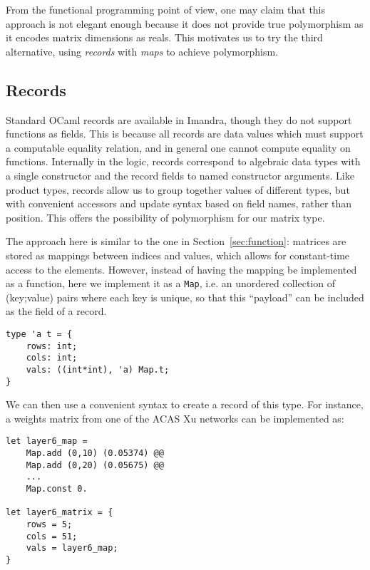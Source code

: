 \documentclass[runningheads]{llncs}
\newcommand{\knote}[1]{\todo[inline, color=blue!20]{#1}}
\begin{document}
From the functional programming point of view, one may claim that this approach is not elegant enough because
it does not provide true polymorphism as it encodes matrix dimensions as reals.
This motivates us to try the third alternative, using \emph{records} with \emph{maps} to achieve polymorphism.

\subsection{Records}

Standard OCaml records are available in Imandra, though they do not support functions as fields. This is because all records are data values which must support a computable equality relation, and in general one cannot compute equality on functions. Internally in the logic, records correspond to algebraic data types with a single constructor and the record fields to named constructor arguments. Like product types, records allow us to group together values of different types, but with convenient accessors and update syntax based on field names, rather than position. This offers the possibility of polymorphism for our matrix type. 

The approach here is similar to the one in Section~\ref{sec:function}: matrices are stored as mappings between indices and values, which allows for constant-time access to the elements. However, instead of having the mapping be implemented as a function, here we implement it as a \lstinline{Map}, i.e. an unordered collection of (key;value) pairs where each key is unique, so that this ``payload'' can be included as the field of a record. 

\begin{lstlisting}
type 'a t = {
	rows: int;
	cols: int;
	vals: ((int*int), 'a) Map.t;
}
\end{lstlisting}

We can then use a convenient syntax to create a record of this type. For instance, a weights matrix from one of the ACAS Xu networks can be implemented as:

\begin{lstlisting}
let layer6_map =
	Map.add (0,10) (0.05374) @@
	Map.add (0,20) (0.05675) @@
	...
	Map.const 0.

let layer6_matrix = {
	rows = 5;
	cols = 51;
	vals = layer6_map;
}
\end{lstlisting}
\end{document}
